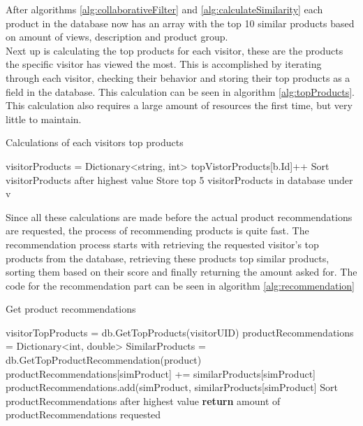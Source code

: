 After algorithms \ref{alg:collaborativeFilter} and \ref{alg:calculateSimilarity} each product in the database now has an array with the top 10 similar products based on amount of views, description and product group. \\
Next up is calculating the top products for each visitor, these are the products the specific visitor has viewed the most. This is accomplished by iterating through each visitor, checking their behavior and storing their top products as a field in the database. This calculation can be seen in algorithm \ref{alg:topProducts}. This calculation also requires a large amount of resources the first time, but very little to maintain.

\begin{algorithm}[H]
\caption{Calculations of each visitors top products}
\label{alg:topProducts}
\begin{algorithmic}[H]
\State visitorProducts = Dictionary<string, int>
\State topVistorProducts[b.Id]++
\EndFor
\State Sort visitorProducts after highest value
\State Store top 5 visitorProducts in database under v
\EndFor
\end{algorithmic}
\end{algorithm}

Since all these calculations are made before the actual product recommendations are requested, the process of recommending products is quite fast. The recommendation process starts with retrieving the requested visitor's top products from the database, retrieving these products top similar products, sorting them based on their score and finally returning the amount asked for. The code for the recommendation part can be seen in algorithm \ref{alg:recommendation}

\begin{algorithm}[H]
\caption{Get product recommendations}
\label{alg:recommendation}
\begin{algorithmic}[H]
\State visitorTopProducts = db.GetTopProducts(visitorUID)
\State productRecommendations = Dictionary<int, double>
\State SimilarProducts = db.GetTopProductRecommendation(product)
\State productRecommendations[simProduct] += similarProducts[simProduct]
\Else
\State productRecommendations.add(simProduct, similarProducts[simProduct]
\EndIf
\EndFor
\EndFor
\State Sort productRecommendations after highest value
\State \textbf{return} amount of productRecommendations requested
\State 
\end{algorithmic}
\end{algorithm}

